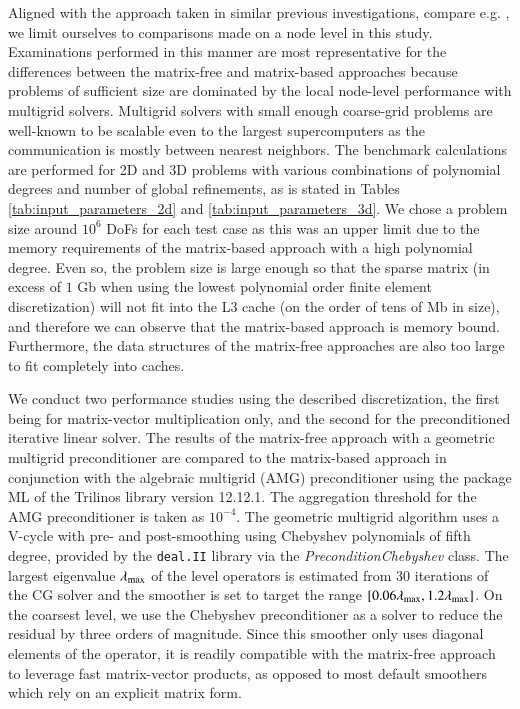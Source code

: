 \documentclass[AMA,STIX1COL]{WileyNJD-v2}
\begin{document}
Aligned with the approach taken in similar previous investigations, compare e.g. \cite{kronbichler2017fast},
we limit ourselves to comparisons made on a node level in this study.
{\color{red}
Examinations performed in this manner are most representative for the differences between the matrix-free and matrix-based approaches because problems of sufficient size are dominated by the local node-level performance with multigrid solvers. Multigrid solvers with small enough coarse-grid problems are well-known to be scalable even to the largest supercomputers \cite{gholami2016,ibeid2018} as the communication is mostly between nearest neighbors.
}
The benchmark calculations are performed for 2D and 3D problems with various combinations of polynomial degrees and number of global refinements, as is stated in Tables \ref{tab:input_parameters_2d} and \ref{tab:input_parameters_3d}.
We chose a problem size around $10^6$ DoFs for each test case as this was an upper limit due to the memory requirements of the matrix-based approach with a high polynomial degree.
Even so, the problem size is large enough so that the sparse matrix (in excess of $1$ Gb when using the lowest polynomial order finite element discretization) will not fit into the L3 cache (on the order of tens of Mb in size), and therefore we can observe that the matrix-based approach is memory bound. {\color{red}Furthermore, the data structures of the matrix-free approaches are also too large to fit completely into caches.}

We conduct two performance studies using the described discretization, the first being for matrix-vector multiplication only, and the second for the preconditioned iterative linear solver.
The results of the matrix-free approach with a geometric multigrid preconditioner are compared to the matrix-based approach in conjunction with the algebraic multigrid (AMG) preconditioner using the package ML \cite{Gee2006a} of the Trilinos \cite{Heroux2005} library version 12.12.1.
The aggregation threshold for the AMG preconditioner is taken as $10^{-4}$.
The geometric multigrid algorithm uses a V-cycle with pre- and post-smoothing using Chebyshev polynomials \cite{Varga2009} of fifth degree, provided
by the \texttt{deal.II} library via the \textit{PreconditionChebyshev} class.
The largest eigenvalue $\lambda_{\rm{max}}$ of the level operators is estimated from $30$ iterations of the CG solver and the smoother
is set to target the range $[0.06\lambda_{\rm{max}}, 1.2\lambda_{\rm{max}}]$.
On the coarsest level, we use the Chebyshev preconditioner as a solver \cite{Varga2009} to reduce the residual by three orders of magnitude.
Since this smoother only uses diagonal elements of the operator, it is readily compatible with the matrix-free approach to leverage fast matrix-vector products, as opposed to most default smoothers which rely on an explicit matrix form.
\end{document}
